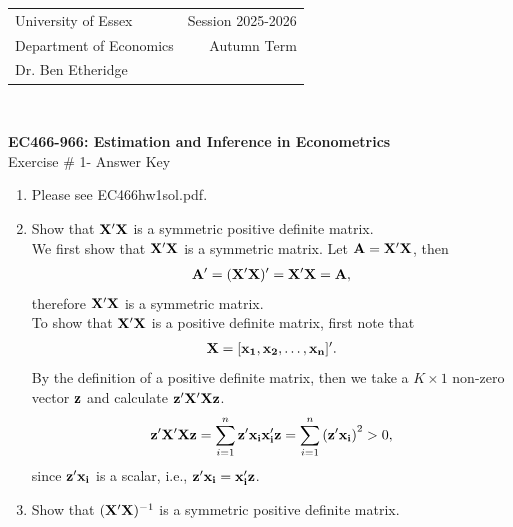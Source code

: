 \documentclass[12pt,a4paper]{article}
\begin{document}
\begin{tabular}{l r}
University of Essex  \hspace{35ex}& Session 2025-2026 \\
Department of Economics \hspace{35ex} & Autumn Term\\
Dr. Ben Etheridge \hspace{35ex} &
\end{tabular}
\\
\begin{center}
\large{\textbf{EC466-966: Estimation and Inference in Econometrics}\\
Exercise \# 1- Answer Key}
\end{center}

\begin{enumerate}
\item{Please see EC466hw1sol.pdf.}
\item{Show that ${\bf X'X}$ is a symmetric positive definite matrix.\\}
We first show that ${\bf X'X}$ is a symmetric matrix. Let ${\bf A=X'X}$, then
\begin{align*}
{\bf A'=(X'X)'=X'X=A},
\end{align*}
therefore ${\bf X'X}$ is a symmetric matrix.\\
To show that ${\bf X'X}$ is a positive definite matrix, first note that
\begin{align*}
{\bf X}=[{\bf x_{1}}, {\bf x_{2}}, \dots, {\bf x_{n}}]'.
\end{align*}
By the definition of a positive definite matrix, then we take a $K \times 1$ non-zero vector ${\bf z}$ and calculate ${\bf z'X'Xz}$. 
\begin{align*}
{\bf z'X'Xz}=\sum_{i=1}^{n} {\bf z'x_{i}x_{i}'z}=\sum_{i=1}^{n} \left({\bf z'x_{i}}\right)^{2}>0,
\end{align*}
since ${\bf z'x_{i}}$ is a scalar, i.e., ${\bf z'x_{i}}={\bf x_{i}'z}$.
\item{Show that $({\bf X'X})^{-1}$ is a symmetric positive definite matrix.\\}


\end{enumerate}
\end{document}
